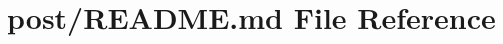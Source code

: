\hypertarget{post_2README_8md}{}\section{post/\+R\+E\+A\+D\+M\+E.md File Reference}
\label{post_2README_8md}
